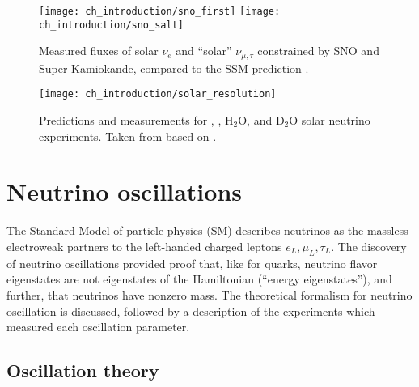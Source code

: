 \begin{figure}
    \centering
    \texttt{[image: ch\_introduction/sno\_first]}
    \texttt{[image: ch\_introduction/sno\_salt]}
    \caption{
        Measured fluxes of solar $\nu_e$ and ``solar'' $\nu_{\mu,\tau}$
        constrained by SNO and Super-Kamiokande,
        compared to the SSM prediction \cite{sno2001,sno_salt2004}.
    }
    \label{fig:sno_plots}
\end{figure}

\begin{figure}
    \centering
    \texttt{[image: ch\_introduction/solar\_resolution]}
    \caption{
        Predictions and measurements for , ,
        $\text{H}_2\text{O}$, and $\text{D}_2\text{O}$ solar neutrino experiments.
        Taken from \cite{bahcall_images} based on \cite{bahcall2005_diagram}.
    }
    \label{fig:solar_neutrino_fixed}
\end{figure}


\section{Neutrino oscillations}
\label{sec:osc_intro}

The Standard Model of particle physics (SM)
describes neutrinos as the massless electroweak partners
to the left-handed charged leptons $e_L,\mu_L,\tau_L$.
The discovery of neutrino oscillations provided proof that,
like for quarks, neutrino flavor eigenstates are not
eigenstates of the Hamiltonian (``energy eigenstates''),
and further, that neutrinos have nonzero mass.
The theoretical formalism for neutrino oscillation is discussed,
followed by a description of the experiments which measured
each oscillation parameter.

\subsection{Oscillation theory}
\label{subsec:theory}

